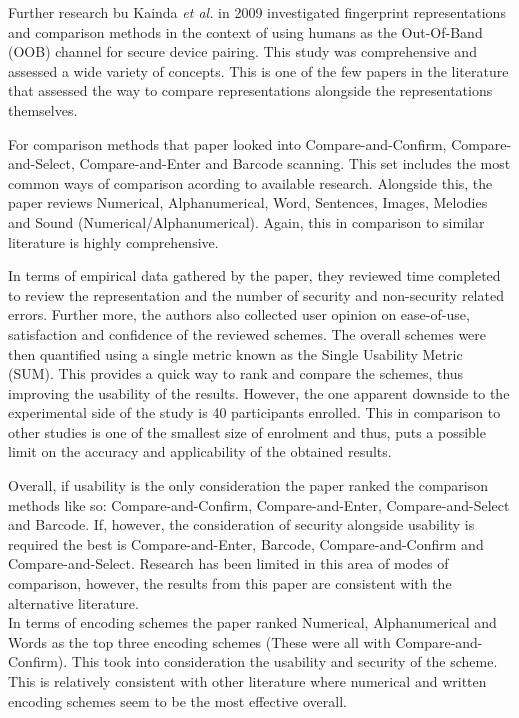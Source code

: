 Further research bu Kainda \textit{et al.}\cite{kainda2009usability} in 2009 investigated fingerprint representations and comparison methods in the context of using humans as the Out-Of-Band (OOB) channel for secure device pairing. This study was comprehensive and assessed a wide variety of concepts. This is one of the few papers in the literature that assessed the way to compare representations alongside the representations themselves.

For comparison methods that paper looked into Compare-and-Confirm, Compare-and-Select, Compare-and-Enter and Barcode scanning. This set includes the most common ways of comparison acording to available research. Alongside this, the paper reviews Numerical, Alphanumerical, Word, Sentences, Images, Melodies and Sound (Numerical/Alphanumerical). Again, this in comparison to similar literature is highly comprehensive.

In terms of empirical data gathered by the paper, they reviewed time completed to review the representation and the number of security and non-security related errors. Further more, the authors also collected user opinion on ease-of-use, satisfaction and confidence of the reviewed schemes. The overall schemes were then quantified using a single metric known as the Single Usability Metric (SUM)\cite{sauro2005method}. This provides a quick way to rank and compare the schemes, thus improving the usability of the results. 
However, the one apparent downside to the experimental side of the study is 40 participants enrolled. This in comparison to other studies is one of the smallest size of enrolment and thus, puts a possible limit on the accuracy and applicability of the obtained results. 

Overall, if usability is the only consideration the paper ranked the comparison methods like so: Compare-and-Confirm, Compare-and-Enter, Compare-and-Select and Barcode. If, however, the consideration of security alongside usability is required the best is Compare-and-Enter, Barcode, Compare-and-Confirm and Compare-and-Select. Research has been limited in this area of modes of comparison, however, the results from this paper are consistent with the alternative literature.
\\
In terms of encoding schemes the paper ranked Numerical, Alphanumerical and Words as the top three encoding schemes (These were all with Compare-and-Confirm). This took into consideration the usability and security of the scheme. This is relatively consistent with other literature where numerical and written encoding schemes seem to be the most effective overall.

